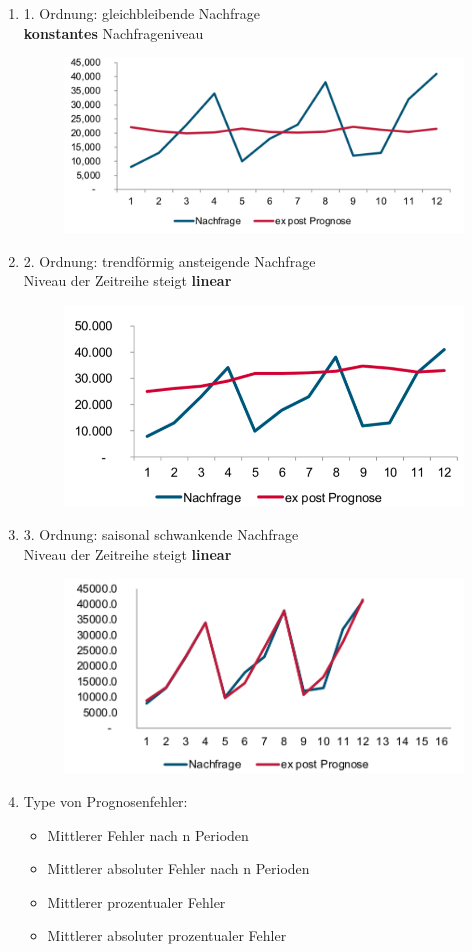\documentclass[12pt, letterpaper]{article}
\begin{document}
\begin{CJK*}{UTF8}{gbsn}
\begin{enumerate}
\item 1. Ordnung: gleichbleibende Nachfrage\\
\textbf{konstantes} Nachfrageniveau\\

\begin{figure}[h!]
  \centering %
  \includegraphics[width=0.5\linewidth]{UE11.jpg}\\[5cm]
\end{figure}

\item 2. Ordnung: trendförmig ansteigende Nachfrage\\
Niveau der Zeitreihe steigt \textbf{linear}\\

\begin{figure}[h!]
  \centering %
  \includegraphics[width=0.5\linewidth]{UE12.jpg}
\end{figure}

\item 3. Ordnung: saisonal schwankende Nachfrage\\
Niveau der Zeitreihe steigt \textbf{linear}\\

\begin{figure}[h!]
  \centering %
  \includegraphics[width=0.5\linewidth]{UE13.jpg}
\end{figure}

\item Type von Prognosenfehler:
\begin{itemize}
\item Mittlerer Fehler nach n Perioden
\item Mittlerer absoluter Fehler nach n Perioden
\item Mittlerer prozentualer Fehler
\item Mittlerer absoluter prozentualer Fehler
\end{itemize}



\end{enumerate}
\end{CJK*}
\end{document}
